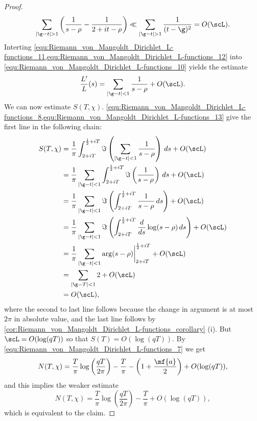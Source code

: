\begin{proof}
        \begin{equation}\label{equ:Riemann_von_Mangoldt_Dirichlet_L-functions_12}
          \sum_{|\g-t| > 1}\left(\frac{1}{s-\rho}-\frac{1}{2+it-\rho}\right) \ll \sum_{|\g-t| > 1}\frac{1}{(t-\g)^{2}} = O(\scL).
        \end{equation}
        Interting \cref{equ:Riemann_von_Mangoldt_Dirichlet_L-functions_11,equ:Riemann_von_Mangoldt_Dirichlet_L-functions_12} into \cref{equ:Riemann_von_Mangoldt_Dirichlet_L-functions_10} yields the estimate
        \begin{equation}\label{equ:Riemann_von_Mangoldt_Dirichlet_L-functions_13}
          \frac{L'}{L}(s) = \sum_{|\g-t| < 1}\frac{1}{s-\rho}+O(\scL).
        \end{equation}
        We can now estimate $S(T,\chi)$. \cref{equ:Riemann_von_Mangoldt_Dirichlet_L-functions_8,equ:Riemann_von_Mangoldt_Dirichlet_L-functions_13} give the first line in the following chain:
        \begin{align*}
          S(T,\chi) &= \frac{1}{\pi}\int_{2+iT}^{\frac{1}{2}+iT}\Im\left(\sum_{|\g-t| < 1}\frac{1}{s-\rho}\right)\,ds+O(\scL) \\
          &= \frac{1}{\pi}\sum_{|\g-t| < 1}\int_{2+iT}^{\frac{1}{2}+iT}\Im\left(\frac{1}{s-\rho}\right)\,ds+O(\scL) \\
          &= \frac{1}{\pi}\sum_{|\g-t| < 1}\Im\left(\int_{2+iT}^{\frac{1}{2}+iT}\frac{1}{s-\rho}\,ds\right)+O(\scL) \\
          &= \frac{1}{\pi}\sum_{|\g-t| < 1}\Im\left(\int_{2+iT}^{\frac{1}{2}+iT}\frac{d}{ds}\log(s-\rho)\,ds\right)+O(\scL) \\
          &= \frac{1}{\pi}\sum_{|\g-t| < 1}\arg(s-\rho)\bigg|_{2+iT}^{\frac{1}{2}+iT}+O(\scL) \\
          &= \sum_{|\g-T| < 1}2+O(\scL) \\
          &= O(\scL),
        \end{align*}
        where the second to last line follows because the change in argument is at most $2\pi$ in absolute value, and the last line follows by \cref{cor:Riemann_von_Mangoldt_Dirichlet_L-functions_corollary} (i). But $\scL = O(\log(qT))$ so that $S(T) = O(\log(qT))$. By \cref{equ:Riemann_von_Mangoldt_Dirichlet_L-functions_7} we get
        \[
          N(T,\chi) = \frac{T}{\pi}\log\left(\frac{qT}{2\pi}\right)-\frac{T}{\pi}-\left(1+\frac{\mf{a}}{2}\right)+O(\log(qT)),
        \]
        and this implies the weaker estimate
        \[
          N(T,\chi) = \frac{T}{\pi}\log\left(\frac{qT}{2\pi}\right)-\frac{T}{\pi}+O(\log(qT)),
        \]
        which is equivalent to the claim.
      \end{proof}

